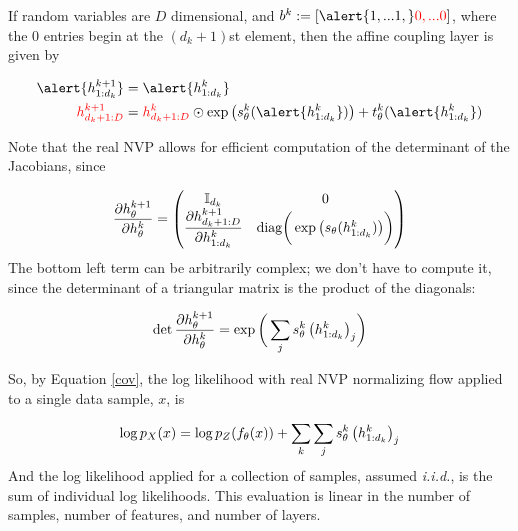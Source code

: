 \documentclass[10pt]{beamer}
\newcommand{\I}{\mathbb{I}}
\begin{document}
\begin{frame}
\begin{example}\label{rnvp_example}

If random variables are $D$ dimensional, and $b^k := [\alert{1,... 1,} \red{ 0,...0}]$, where the 0 entries begin at the $(d_{k}+1)$st element, then the affine coupling layer is given by

\begin{align*}
\alert{h^{k+1}_{1:d_k}} &= \alert{h^k_{1:d_k}} \\
\red{h^{k+1}_{d_k+1:D}} &= \red{h^k_{d_k+1:D}} \odot \exp \big( s^k_\theta(\alert{h^k_{1:d_k}}) \big) + t^k_\theta(\alert{h^k_{1:d_k}})  \\
\end{align*}

\end{example}
\end{frame}

\begin{frame}
Note that the real NVP allows for efficient computation of the determinant of the Jacobians, since 

\[ \df{\partial h_\theta^{k+1}}{\partial h_\theta^{k}} = 
	\begin{pmatrix}
	\I_{d_k} & 0\\ 
	\df{\partial h_{d_k+1:D}^{k+1}}{\partial h_{1:d_k}^{k}} & \text{diag} \bigg( \exp \big( s_\theta (h^k_{1:d_k}) \big) \bigg) 
	\end{pmatrix}
\]
The bottom left term can be arbitrarily complex; we don't have to compute it, since the determinant of a triangular matrix is the product of the diagonals:

\[ \det \displaystyle\frac{\partial h_\theta^{k+1}}{\partial h_\theta^{k}} = \exp \bigg( \displaystyle\sum_j s_\theta^k \, \big( h^k_{1:d_k} \big)_j \bigg) \] 
\end{frame}

%

\begin{frame}
So, by Equation \ref{cov}, the log likelihood with real NVP normalizing flow applied to a single data sample, $x$, is

\[ \log p_X(x) = \log p_Z( f_\theta(x) ) + \displaystyle\sum_k \displaystyle\sum_j s_\theta^k \, \big( h^k_{1:d_k} \big)_j \] 
\pause 
\vfill
And the log likelihood applied for a collection of samples, assumed \textit{i.i.d.}, is the sum of individual log likelihoods. 
\pause
\vfill
This evaluation is linear in the number of samples, number of features, and number of layers.
\end{frame}
 
\end{document}
